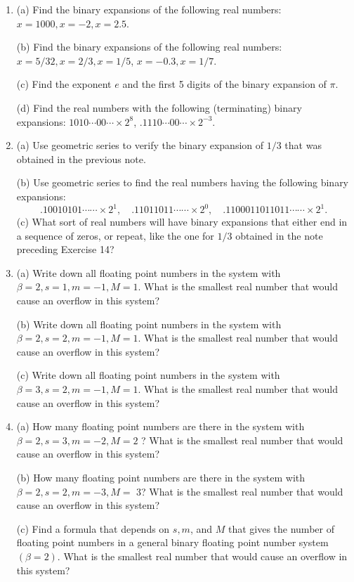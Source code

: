 \documentclass[../main.tex]{subfiles}
\begin{document}
\begin{enumerate}
\item (a) Find the binary expansions of the following real numbers: $x=1000, x=-2, x=2.5$.

(b) Find the binary expansions of the following real numbers: $x=5 / 32, x=2 / 3, x=1 / 5$, $x=-0.3, x=1 / 7$.

(c) Find the exponent $e$ and the first 5 digits of the binary expansion of $\pi$.

(d) Find the real numbers with the following (terminating) binary expansions: $1010 \cdots 00 \cdots \times 2^{8}$, $.1110 \cdots 00 \cdots \times 2^{-3}$.

\item (a) Use geometric series to verify the binary expansion of $1 / 3$ that was obtained in the previous note.

(b) Use geometric series to find the real numbers having the following binary expansions:
$$
.10010101 \cdots \cdots \times 2^{1}, \quad .11011011 \cdots \cdots \times 2^{0}, \quad .1100011011011 \cdots \cdots \times 2^{1} \text {. }
$$
(c) What sort of real numbers will have binary expansions that either end in a sequence of zeros, or repeat, like the one for $1 / 3$ obtained in the note preceding Exercise 14?

\item (a) Write down all floating point numbers in the system with $\beta=2, s=1, m=-1, M=1$. What is the smallest real number that would cause an overflow in this system?

(b) Write down all floating point numbers in the system with $\beta=2, s=2, m=-1, M=1$. What is the smallest real number that would cause an overflow in this system?

(c) Write down all floating point numbers in the system with $\beta=3, s=2, m=-1, M=1$. What is the smallest real number that would cause an overflow in this system?

\item (a) How many floating point numbers are there in the system with $\beta=2, s=3, m=-2, M=2$ ? What is the smallest real number that would cause an overflow in this system?

(b) How many floating point numbers are there in the system with $\beta=2, s=2, m=-3, M=$ 3? What is the smallest real number that would cause an overflow in this system?

(c) Find a formula that depends on $s, m$, and $M$ that gives the number of floating point numbers in a general binary floating point number system $(\beta=2)$. What is the smallest real number that would cause an overflow in this system?


\end{enumerate}
\end{document}
